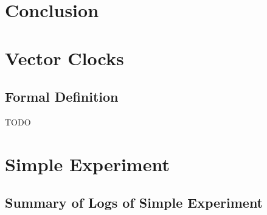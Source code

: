 \documentclass[12pt,a4paper,twoside,openright]{report}
\begin{document}
		
		
		
		
		


\chapter{Conclusion}



\printbibliography

\appendix

\chapter{Vector Clocks}

\section{Formal Definition}
\label{appendix:vectorclocks}
TODO


\chapter{Simple Experiment}

\section{Summary of Logs of Simple Experiment}
\label{appendix:simplelogsummary}
\end{document}
